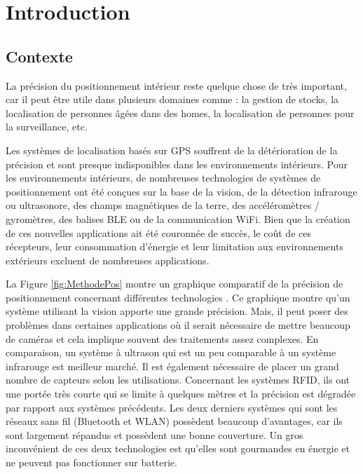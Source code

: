 \chapter{Introduction}

\section{Contexte}
La précision du positionnement intérieur reste quelque chose de très important, car il peut être utile dans plusieurs domaines comme : la gestion de stocks, la localisation de personnes âgées dans des homes, la localisation de personnes pour la surveillance, etc.

Les systèmes de localisation basés sur GPS souffrent de la détérioration de la précision et sont presque indisponibles dans les environnements intérieurs. Pour les environnements intérieurs, de nombreuses technologies de systèmes de positionnement ont été conçues sur la base de la vision, de la détection infrarouge ou ultrasonore, des champs magnétiques de la terre, des accéléromètres / gyromètres, des balises BLE ou de la communication WiFi. Bien que la création de ces nouvelles applications ait été couronnée de succès, le coût de ces récepteurs, leur consommation d’énergie et leur limitation aux environnements extérieurs excluent de nombreuses applications.

La Figure \ref{fig:MethodePos} montre un graphique comparatif de la précision de positionnement concernant différentes technologies \cite{INPOS}. Ce graphique montre qu'un système utilisant la vision apporte une grande précision. Mais, il peut poser des problèmes dans certaines applications où il serait nécessaire de mettre beaucoup de caméras et cela implique souvent des traitements assez complexes. En comparaison, un système à ultrason qui est un peu comparable à un système infrarouge est meilleur marché. Il est également nécessaire de placer un grand nombre de capteurs selon les utilisations. Concernant les systèmes RFID, ils ont une portée très courte qui se limite à quelques mètres et la précision est dégradée par rapport aux systèmes précédents. Les deux derniers systèmes qui sont les réseaux sans fil (Bluetooth et WLAN) possèdent beaucoup d'avantages, car ils sont largement répandus et possèdent une bonne couverture. Un gros inconvénient de ces deux technologies est qu'elles sont gourmandes en énergie et ne peuvent pas fonctionner sur batterie.

